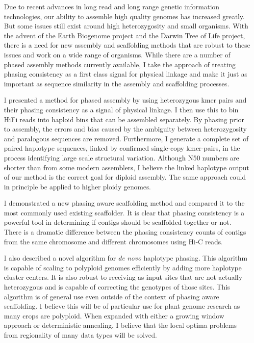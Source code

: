 \par{
Due to recent advances in long read and long range genetic information technologies, our ability to assemble high quality genomes has increased greatly. But some issues still exist around high heterozygosity and small organisms. With the advent of the Earth Biogenome project and the Darwin Tree of Life project, there is a need for new assembly and scaffolding methods that are robust to these issues and work on a wide range of organisms. While there are a number of phased assembly methods currently available, I take the approach of treating phasing consistency as a first class signal for physical linkage and make it just as important as sequence similarity in the assembly and scaffolding processes.
} 

\par{
I presented a method for phased assembly by using heterozygous kmer pairs and their phasing consistency as a signal of physical linkage. I then use this to bin HiFi reads into haploid bins that can be assembled separately. By phasing prior to assembly, the errors and bias caused by the ambiguity between heterozygosity and paralogous sequences are removed. Furthermore, I generate a complete set of paired haplotype sequences, linked by confirmed single-copy kmer-pairs, in the process identifying large scale structural variation.  Although N50 numbers are shorter than from some modern assemblers, I believe the linked haplotype output of our method is the correct goal for diploid assembly. The same approach could in principle be applied to higher ploidy genomes.
}

\par{
I demonstrated a new phasing aware scaffolding method and compared it to the most commonly used existing scaffolder. It is clear that phasing consistency is a powerful tool in determining if contigs should be scaffolded together or not. There is a dramatic difference between the phasing consistency counts of contigs from the same chromosome and different chromosomes using Hi-C reads.
} 

\par{
I also described a novel algorithm for \textit{de novo} haplotype phasing. This algorithm is capable of scaling to polyploid genomes efficiently by adding more haplotype cluster centers. It is also robust to receiving as input sites that are not actually heterozygous and is capable of correcting the genotypes of those sites. This algorithm is of general use even outside of the context of phasing aware scaffolding. I believe this will be of particular use for plant genome research as many crops are polyploid. When expanded with either a growing window approach or deterministic annealing, I believe that the local optima problems from regionality of many data types will be solved.
} 








